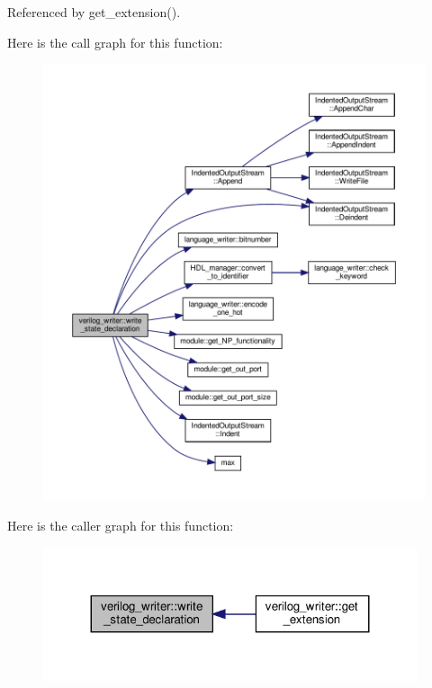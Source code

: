 Referenced by get\+\_\+extension().

Here is the call graph for this function\+:
\nopagebreak
\begin{figure}[H]
\begin{center}
\leavevmode
\includegraphics[width=350pt]{d8/dba/classverilog__writer_a97913d24c2a3524e21363688c90f3eb0_cgraph}
\end{center}
\end{figure}
Here is the caller graph for this function\+:
\nopagebreak
\begin{figure}[H]
\begin{center}
\leavevmode
\includegraphics[width=311pt]{d8/dba/classverilog__writer_a97913d24c2a3524e21363688c90f3eb0_icgraph}
\end{center}
\end{figure}
\mbox{\label{classverilog__writer_ab65a214d6736e0fa5de6f2d5d085227f}} 
